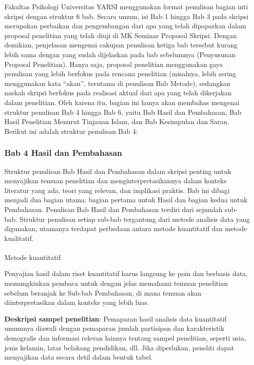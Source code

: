\documentclass[
  indonesian,
  letterpaper,
]{scrbook}
\makeatletter
\let\oldparagraph\paragraph
\renewcommand{\paragraph}{
    \@ifstar
      \xxxParagraphStar
      \xxxParagraphNoStar
  }
\newcommand{\xxxParagraphStar}[1]{\oldparagraph*{#1}\mbox{}}
\newcommand{\xxxParagraphNoStar}[1]{\oldparagraph{#1}\mbox{}}
\makeatother
\begin{document}
Fakultas Psikologi Universitas YARSI menggunakan format penulisan bagian
inti skripsi dengan struktur 6 bab. Secara umum, isi Bab 1 hingga Bab 3
pada skripsi merupakan perbaikan dan pengembangan dari apa yang telah
dipaparkan dalam proposal penelitian yang telah diuji di MK Seminar
Proposal Skripsi. Dengan demikian, penjelasan mengenai cakupan penulisan
ketiga bab tersebut kurang lebih sama dengan yang sudah dijelaskan pada
bab sebelumnya (Penyusunan Proposal Penelitian). Hanya saja, proposal
penelitian menggunakan gaya penulisan yang lebih berfokus pada rencana
penelitian (misalnya, lebih sering menggunakan kata ``akan'', terutama
di penulisan Bab Metode), sedangkan naskah skripsi berfokus pada
realisasi aktual dari apa yang telah dikerjakan dalam penelitian. Oleh
karena itu, bagian ini hanya akan membahas mengenai struktur penulisan
Bab 4 hingga Bab 6, yaitu Bab Hasil dan Pembahasan, Bab Hasil Penelitian
Menurut Tinjauan Islam, dan Bab Kesimpulan dan Saran. Berikut ini adalah
struktur penulisan Bab 4:

\subsubsection{Bab 4 Hasil dan
Pembahasan}\label{bab-4-hasil-dan-pembahasan}

Struktur penulisan Bab Hasil dan Pembahasan dalam skripsi penting untuk
menyajikan temuan penelitian dan menginterpretasikannya dalam konteks
literatur yang ada, teori yang relevan, dan implikasi praktis. Bab ini
dibagi menjadi dua bagian utama: bagian pertama untuk Hasil dan bagian
kedua untuk Pembahasan. Penulisan Bab Hasil dan Pembahasan terdiri dari
sejumlah sub-bab. Struktur penulisan setiap sub-bab tergantung dari
metode analisis data yang digunakan, utamanya terdapat perbedaan antara
metode kuantitatif dan metode kualitatif.

\paragraph{Metode kuantitatif}\label{metode-kuantitatif}

Penyajian hasil dalam riset kuantitatif harus langsung ke poin dan
berbasis data, memungkinkan pembaca untuk dengan jelas memahami temuan
penelitian sebelum beranjak ke Sub-bab Pembahasan, di mana temuan akan
diinterpretasikan dalam konteks yang lebih luas.

\textbf{Deskripsi sampel penelitian}: Pemaparan hasil analisis data
kuantitatif umumnya diawali dengan pemaparan jumlah partisipan dan
karakteristik demografis dan informasi relevan lainnya tentang sampel
penelitian, seperti usia, jenis kelamin, latar belakang pendidikan, dll.
Jika diperlukan, peneliti dapat menyajikan data secara detil dalam
bentuk tabel.
\end{document}
